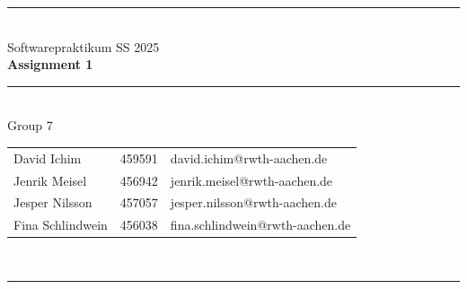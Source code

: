 \documentclass[a4paper,12pt]{article}
\begin{document}
\begin{center}
	\rule{\textwidth}{0.1pt}\\[1cm]
	\Large Softwarepraktikum SS 2025\\\bf Assignment 1 %
\end{center}


\begin{center}
	\rule{\textwidth}{0.1pt}\\[0.5cm]
	{\Large Group 7\\[5mm]}

	\begin{tabular}{lll}
		David Ichim & 459591 & david.ichim@rwth-aachen.de \\
		Jenrik Meisel & 456942 & jenrik.meisel@rwth-aachen.de \\
		Jesper Nilsson & 457057 & jesper.nilsson@rwth-aachen.de \\
		Fina Schlindwein & 456038 & fina.schlindwein@rwth-aachen.de \\
	\end{tabular}\\[0.5cm]

	\rule{\textwidth}{0.1pt}\\[1cm]

\end{center}







\end{document}
